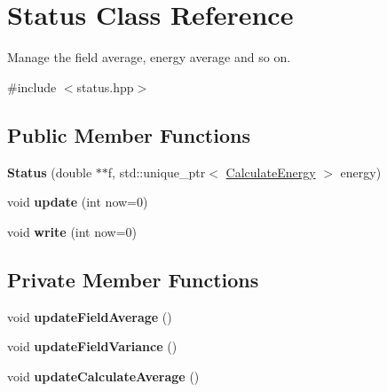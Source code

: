 \hypertarget{class_status}{}\section{Status Class Reference}
\label{class_status}


Manage the field average, energy average and so on.  




{\ttfamily \#include $<$status.\+hpp$>$}

\subsection*{Public Member Functions}
\begin{DoxyCompactItemize}
\item 
\mbox{\label{class_status_a8c6ce98f2eeeabfbf5469c31dc846ecd}} 
{\bfseries Status} (double $\ast$$\ast$f, std\+::unique\+\_\+ptr$<$ \mbox{\hyperlink{class_calculate_energy}{Calculate\+Energy}} $>$ energy)
\item 
\mbox{\label{class_status_aee5635f7aba23798c42460d8b1e223bb}} 
void {\bfseries update} (int now=0)
\item 
\mbox{\label{class_status_acae978a23f1af0761ab95b6ad7fd376a}} 
void {\bfseries write} (int now=0)
\end{DoxyCompactItemize}
\subsection*{Private Member Functions}
\begin{DoxyCompactItemize}
\item 
\mbox{\label{class_status_a07b8fac037e56b2359e390bca99a9b6a}} 
void {\bfseries update\+Field\+Average} ()
\item 
\mbox{\label{class_status_a7380d900d7af2cbe3eeffa4350e05534}} 
void {\bfseries update\+Field\+Variance} ()
\item 
\mbox{\label{class_status_a78fce4aa8bf9d9b035fa41755f6dba47}} 
void {\bfseries update\+Calculate\+Average} ()
\end{DoxyCompactItemize}
